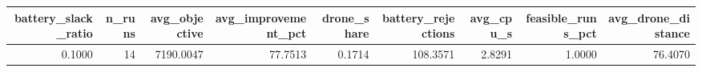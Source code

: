 \begin{tabular}{rrrrrrrrr}
\toprule
battery_slack_ratio & n_runs & avg_objective & avg_improvement_pct & drone_share & battery_rejections & avg_cpu_s & feasible_runs_pct & avg_drone_distance \\
\midrule
0.1000 & 14 & 7190.0047 & 77.7513 & 0.1714 & 108.3571 & 2.8291 & 1.0000 & 76.4070 \\
\bottomrule
\end{tabular}
